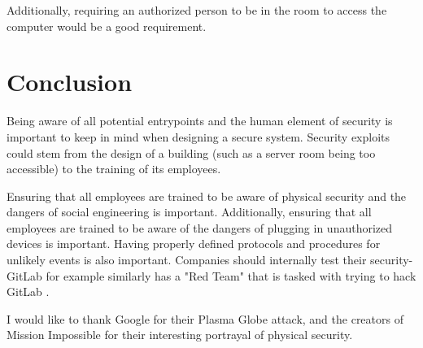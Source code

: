 \documentclass[acmsmall]{acmart}
\begin{document}
Additionally, requiring an authorized person to be in the room to access the
computer would be a good requirement.

\section{Conclusion}
Being aware of all potential entrypoints and the human element of security is important
to keep in mind when designing a secure system. Security exploits could stem from the
design of a building (such as a server room being too accessible) to the training of
its employees.

Ensuring that all employees are trained to be aware of physical security and the dangers
of social engineering is important. Additionally, ensuring that all employees are trained
to be aware of the dangers of plugging in unauthorized devices is important. Having properly
defined protocols and procedures for unlikely events is also important.
Companies should internally test their security- GitLab for example similarly has a
"Red Team" that is tasked with trying to hack GitLab \cite{GitLab}.

\begin{acks}
  I would like to thank Google for their Plasma Globe attack, and the creators of
  Mission Impossible for their interesting portrayal of physical security.
\end{acks}



\end{document}
